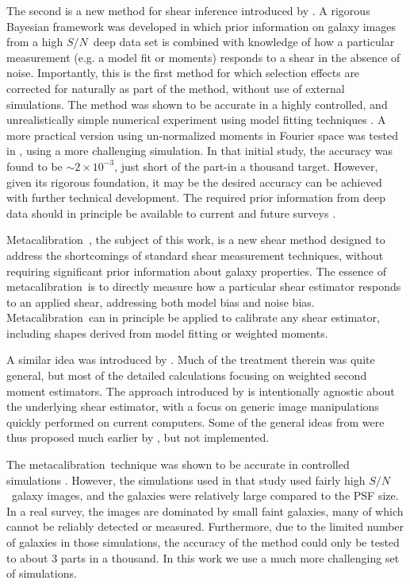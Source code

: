 \documentclass[a4paper,fleqn,usenatbib]{mnras}
\newcommand{\snr}{$S/N$}
\newcommand{\mcal}{metacalibration}
\newcommand{\Mcal}{Metacalibration}
\begin{document}
The second is a new method for shear inference introduced by
\citep{ba14,bfd2016}.  A rigorous Bayesian framework was developed in which
prior information on galaxy images from a high \snr\ deep data set is combined
with knowledge of how a particular measurement (e.g. a model fit or moments)
responds to a shear in the absence of noise.  Importantly, this is the first
method for which selection effects are corrected for naturally as part of the
method, without use of external simulations.  The method was shown to be
accurate in a highly controlled, and unrealistically simple numerical
experiment using model fitting techniques \citep{Sheldon2014}.  A more
practical version using un-normalized moments in Fourier space was tested in
\cite{bfd2016}, using a more challenging simulation.  In that initial study,
the accuracy was found to be $\sim 2 \times 10^{-3}$, just short of the part-in
a thousand target.  However, given its rigorous foundation, it may be the
desired accuracy can be achieved with further technical development.  The
required prior information from deep data should in principle be available to
current and future surveys
\citep{DESWhitePaper,TakadaHSC2010,IvezicLSST08,Euclid2011,SpergelWFIRST2015}.

\Mcal\ \citep{HuffMcal}, the subject of this work, is a new shear
method designed to address the shortcomings of standard shear measurement
techniques, without requiring significant prior information about galaxy
properties.  The essence of \mcal\ is to directly measure how a particular
shear estimator responds to an applied shear, addressing both model bias and
noise bias.  \Mcal\ can in principle be applied to calibrate any shear
estimator, including shapes derived from model fitting or weighted moments.

A similar idea was introduced by \cite{Kaiser2000}.  Much of the treatment
therein was quite general, but most of the detailed calculations focusing on
weighted second moment estimators.  The approach introduced by \citep{HuffMcal}
is intentionally agnostic about the underlying shear estimator, with a focus on
generic image manipulations quickly performed on current computers.  Some
of the general ideas from \citep{HuffMcal} were thus proposed much earlier by
\cite{Kaiser2000}, but not implemented.

The \mcal\ technique was shown to be accurate in controlled simulations
\citep{HuffMcal}.  However, the simulations used in that study \citep[based on
those used in][]{great3} used fairly high \snr\ galaxy images, and the galaxies
were relatively large compared to the PSF size.  In a real survey, the images
are dominated by small faint galaxies, many of which cannot be reliably
detected or measured.  Furthermore, due to the limited number of galaxies in
those simulations, the accuracy of the method could only be tested to about 3
parts in a thousand.  In this work we use a much more challenging set of
simulations.
\end{document}
